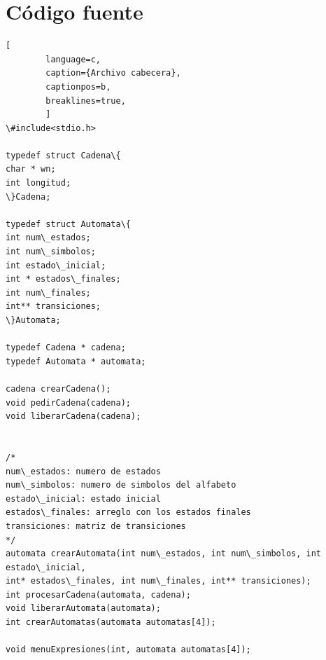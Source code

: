 \documentclass[letterpaper,11pt,twoside]{article}
\begin{document}
	\section*{Código fuente}
	
	\begin{lstlisting}[
		language=c,
		caption={Archivo cabecera},
		captionpos=b,
		breaklines=true,		
		]
\#include<stdio.h>

typedef struct Cadena\{
char * wn;
int longitud;
\}Cadena;

typedef struct Automata\{
int num\_estados;
int num\_simbolos;
int estado\_inicial;
int * estados\_finales;
int num\_finales;
int** transiciones;
\}Automata;

typedef Cadena * cadena;
typedef Automata * automata;

cadena crearCadena();
void pedirCadena(cadena);
void liberarCadena(cadena);


/*
num\_estados: numero de estados
num\_simbolos: numero de simbolos del alfabeto
estado\_inicial: estado inicial
estados\_finales: arreglo con los estados finales
transiciones: matriz de transiciones
*/
automata crearAutomata(int num\_estados, int num\_simbolos, int estado\_inicial,
int* estados\_finales, int num\_finales, int** transiciones);
int procesarCadena(automata, cadena);
void liberarAutomata(automata);
int crearAutomatas(automata automatas[4]);

void menuExpresiones(int, automata automatas[4]);
	\end{lstlisting}
	
	\cleardoublepage
	
\end{document}
